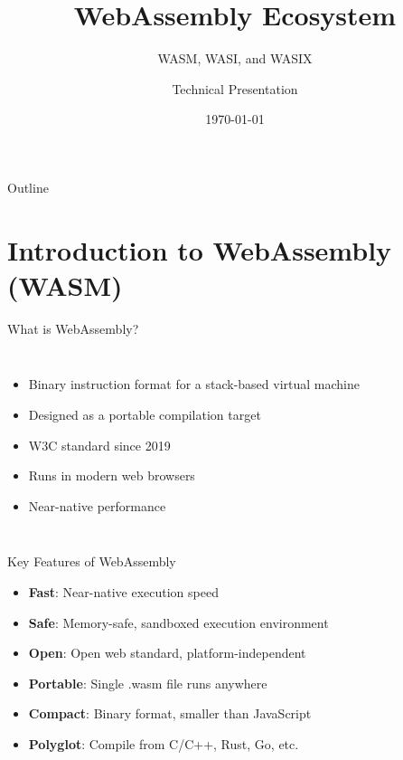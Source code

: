 \documentclass[11pt,aspectratio=169]{beamer}
\title{WebAssembly Ecosystem}
\subtitle{WASM, WASI, and WASIX}
\author{Technical Presentation}
\date{\today}
\institute{Modern Web Technologies}
\begin{document}
\frame{\titlepage}

\begin{frame}{Outline}
\tableofcontents
\end{frame}

\section{Introduction to WebAssembly (WASM)}

\begin{frame}{What is WebAssembly?}
\begin{columns}
\begin{itemize}
    \item Binary instruction format for a stack-based virtual machine
    \item Designed as a portable compilation target
    \item W3C standard since 2019
    \item Runs in modern web browsers
    \item Near-native performance
\end{itemize}

\end{columns}
\end{frame}

\begin{frame}{Key Features of WebAssembly}
\begin{itemize}
    \item \textbf{Fast}: Near-native execution speed
    \item \textbf{Safe}: Memory-safe, sandboxed execution environment
    \item \textbf{Open}: Open web standard, platform-independent
    \item \textbf{Portable}: Single .wasm file runs anywhere
    \item \textbf{Compact}: Binary format, smaller than JavaScript
    \item \textbf{Polyglot}: Compile from C/C++, Rust, Go, etc.
\end{itemize}
\end{frame}
\end{document}
